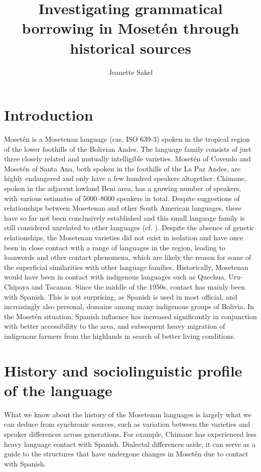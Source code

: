\documentclass[output=paper,colorlinks,citecolor=brown
]{langscibook}
\author{Jeanette Sakel\orcid{}\affiliation{University of the West of England}}
\title[Investigating grammatical borrowing in Mosetén]{Investigating grammatical borrowing in Mosetén through historical sources}
\begin{document}
\maketitle

\section{Introduction}
Mosetén is a Mosetenan language (cas, ISO 639-3) spoken in the tropical region of the lower foothills of the Bolivian Andes. The language family consists of just three closely related and mutually intelligible varieties. Mosetén of Covendo and Mosetén of Santa Ana, both spoken in the foothills of the La Paz Andes, are highly endangered and only have a few hundred speakers altogether. Chimane, spoken in the adjacent lowland Beni area, has a growing number of speakers, with various estimates of 5000--8000 speakers in total. Despite suggestions of relationships between Mosetenan and other South American languages, these have so far not been conclusively established and this small language family is still considered unrelated to other languages (cf. \citealt{sakel2004grammar}). Despite the absence of genetic relationships, the Mosetenan varieties did not exist in isolation and have once been in close contact with a range of languages in the region, leading to loanwords and other contact phenomena, which are likely the reason for some of the superficial similarities with other language families. Historically, Mosetenan would have been in contact with indigenous languages such as Quechua, Uru-Chipaya and Tacanan. Since the middle of the 1950s, contact has mainly been with Spanish. This is not surprising, as Spanish is used in most official, and increasingly also personal, domains among many indigenous groups of Bolivia. In the Mosetén situation, Spanish influence has increased significantly in conjunction with better accessibility to the area, and subsequent heavy migration of indigenous farmers from the highlands in search of better living conditions.


\section{History and sociolinguistic profile of the language}
What we know about the history of the Mosetenan languages is largely what we can deduce from synchronic sources, such as variation between the varieties and speaker differences across generations. For example, Chimane has experienced less heavy language contact with Spanish. Dialectal differences aside, it can serve as a guide to the structures that have undergone changes in Mosetén due to contact with Spanish.
\end{document}

